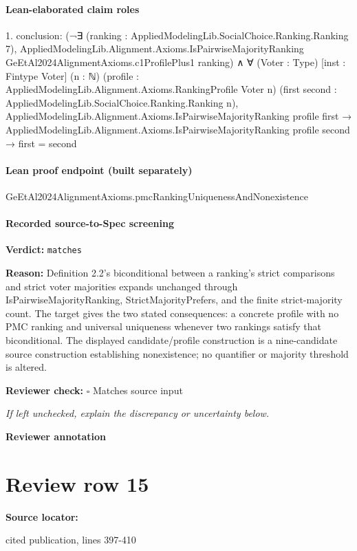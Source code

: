 \documentclass[10pt]{article}
\newcommand{\reviewerbox}{%
  \par\noindent\fbox{\parbox{0.96\linewidth}{\rule{0pt}{0.38in}}}\par
}
\newcommand{\reviewmatch}[1]{%
  \par\noindent\textbf{Reviewer check:} $\square$\; #1\par
  \noindent\emph{If left unchecked, explain the discrepancy or uncertainty below.}\par
}
\begin{document}
\paragraph{Lean-elaborated claim roles}\begin{ReviewVerbatim}
1. conclusion: (¬∃ (ranking : AppliedModelingLib.SocialChoice.Ranking.Ranking 7),
      AppliedModelingLib.Alignment.Axioms.IsPairwiseMajorityRanking GeEtAl2024AlignmentAxioms.c1ProfilePlus1 ranking) ∧
  ∀ (Voter : Type) [inst : Fintype Voter] (n : ℕ) (profile : AppliedModelingLib.Alignment.Axioms.RankingProfile Voter n)
    (first second : AppliedModelingLib.SocialChoice.Ranking.Ranking n),
    AppliedModelingLib.Alignment.Axioms.IsPairwiseMajorityRanking profile first →
      AppliedModelingLib.Alignment.Axioms.IsPairwiseMajorityRanking profile second → first = second
\end{ReviewVerbatim}

\paragraph{Lean proof endpoint (built separately)}\begin{ReviewVerbatim}
GeEtAl2024AlignmentAxioms.pmcRankingUniquenessAndNonexistence
\end{ReviewVerbatim}

\paragraph{Recorded source-to-Spec screening}
\textbf{Verdict:} \texttt{matches}
\\
{\raggedright
\textbf{Reason:} Definition 2.\allowbreak{}2's biconditional between a ranking's strict comparisons and strict voter majorities expands unchanged through IsPairwiseMajorityRanking, StrictMajorityPrefers, and the finite strict-\allowbreak{}majority count.\allowbreak{}  The target gives the two stated consequences:\allowbreak{} a concrete profile with no PMC ranking and universal uniqueness whenever two rankings satisfy that biconditional.\allowbreak{}  The displayed candidate/\allowbreak{}profile construction is a nine-\allowbreak{}candidate source construction establishing nonexistence;\allowbreak{} no quantifier or majority threshold is altered.\allowbreak{}
\par}
\reviewmatch{Matches source input}
\noindent\textbf{Reviewer annotation}\par
\reviewerbox
\clearpage
\hypertarget{source-claim-d5b15047bfa92842}{}
\section*{Review row 15}
\textbf{Source locator:} {\footnotesize\raggedright cited publication, lines 397-\allowbreak{}410\par}
\end{document}
